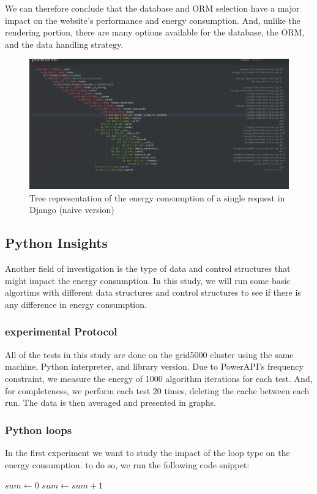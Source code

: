 We can therefore conclude that the database and ORM selection have a major impact on the website's performance and energy consumption.
And, unlike the rendering portion, there are many options available for the database, the ORM, and the data handling strategy.

\begin{figure}[!hbt]
    \centering
    \includegraphics[width=\linewidth]{imgs/django_profiled_optimized}
    \caption{Tree representation of the energy consumption of a single request in Django (naive version)}
    \label{fig:django_profiled_optimized}
\end{figure}


\subsection{Python Insights}
Another field of investigation is the type of data and control structures that might impact the energy consumption.
In this study, we will run some basic algortims with different data structures and control structures to see if there is any difference in energy consumption.
\subsubsection{experimental Protocol}
All of the tests in this study are done on the grid5000 cluster using the same machine, Python interpreter, and library version. Due to PowerAPI's frequency constraint, we measure the energy of 1000 algorithm iterations for each test. And, for completeness, we perform each test 20 times, deleting the cache between each run. The data is then averaged and presented in graphs.

\subsubsection{Python loops}
In the first experiment we want to study the impact of the loop type on the energy consumption. to do so, we run the following code snippet:
\begin{algorithm}[!htb]
    \begin{algorithmic}[1]
        \State $sum \gets 0$
        \State $sum \gets sum+1$
        \EndFor
        \State {}
    \end{algorithmic}
\end{algorithm}

